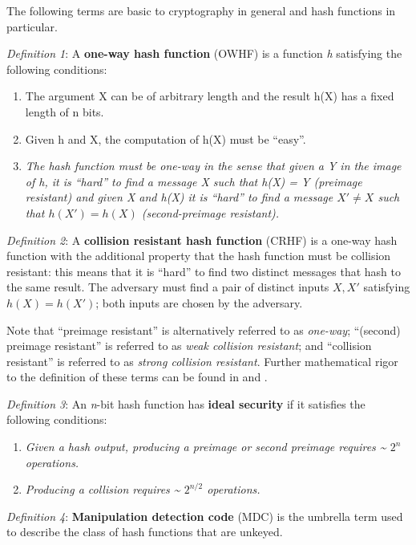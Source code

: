 The following terms are basic to cryptography in general and hash
functions in particular.

\emph{Definition 1}: A \textbf{one-way hash function} (OWHF) is a
function \emph{h} satisfying the following conditions:

\begin{enumerate}
\def\labelenumi{\arabic{enumi}.}
\tightlist
\item
  The argument X can be of arbitrary length and the result h(X) has a
  fixed length of n bits.
\item
  Given h and X, the computation of h(X) must be ``easy''.
\item
  \emph{The hash function must be one-way in the sense that given a Y in
  the image of h, it is ``hard'' to find a message X such that h(X) = Y
  (preimage resistant) and given X and h(X) it is ``hard'' to find a
  message \(X'\ne X\) such that \(h(X')=h(X)\) (second-preimage
  resistant).}
\end{enumerate}

\emph{Definition 2}: A \textbf{collision resistant hash function} (CRHF)
is a one-way hash function with the additional property that the hash
function must be collision resistant: this means that it is ``hard'' to
find two distinct messages that hash to the same result. The adversary must find a pair of distinct inputs $X,X'$ satisfying
$h(X)=h(X')$; both inputs are chosen by the adversary.

Note that ``preimage resistant'' is alternatively referred to as
\emph{one-way}; ``(second) preimage resistant'' is referred to as
\emph{weak collision resistant}; and ``collision resistant'' is referred
to as \emph{strong collision resistant}. Further mathematical rigor to
the definition of these terms can be found in \cite{ref2} and
\cite{ref17}.

\emph{Definition 3}: An \emph{n}-bit hash function has \textbf{ideal
security} if it satisfies the following conditions:

\begin{enumerate}
\def\labelenumi{\arabic{enumi}.}
\tightlist
\item
  \emph{Given a hash output, producing a preimage or second preimage
  requires \textasciitilde{} \(2^n\) operations.}
\item
  \emph{Producing a collision requires \textasciitilde{} \(2^{n/2}\)
  operations.}
\end{enumerate}

\emph{Definition 4}: \textbf{Manipulation detection code} (MDC) is the
umbrella term used to describe the class of hash functions that are
unkeyed.

